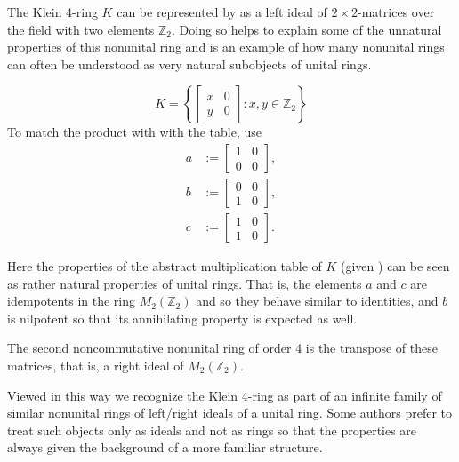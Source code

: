 \documentclass[12pt]{article}
\begin{document}
The Klein $4$-ring $K$ can be represented by as a left ideal of $2\times 2$-matrices
over the field with two elements $\mathbb{Z}_2$.  Doing so helps to explain
some of the unnatural properties of this nonunital ring and is an example of how 
many nonunital rings can often be understood as very natural subobjects of unital 
rings.

\begin{equation}
K=\left\{ \begin{bmatrix} x & 0\\ y & 0\end{bmatrix} : x,y\in\mathbb{Z}_2\right\}
\end{equation}
To match the product with with the table, use
\begin{align*}
a & := \begin{bmatrix} 1 & 0 \\ 0 & 0 \end{bmatrix},\\
b & := \begin{bmatrix} 0 & 0\\ 1 & 0 \end{bmatrix},\\
c & := \begin{bmatrix} 1 & 0 \\ 1 & 0 \end{bmatrix}.
\end{align*}

Here the properties of the abstract multiplication table of $K$ (given 
) can be
seen as rather natural properties of unital rings.  That is, the elements
$a$ and $c$ are idempotents in the ring $M_2(\mathbb{Z}_2)$ and so they
behave similar to identities, and $b$ is nilpotent so that its annihilating
property is expected as well.

The second noncommutative nonunital ring of order 4 is the transpose of these matrices,
that is, a right ideal of $M_2(\mathbb{Z}_2)$.

Viewed in this way we recognize the Klein $4$-ring as part of an infinite family
of similar nonunital rings of left/right ideals of a unital ring.  Some authors
prefer to treat such objects only as ideals and not as rings so that the properties 
are always given the background of a more familiar structure.
\end{document}
